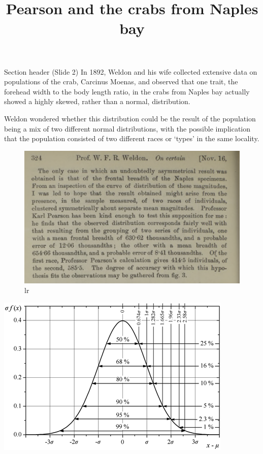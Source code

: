 \documentclass[
  ignorenonframetext,
]{beamer}
\title{Pearson and the crabs from Naples bay}
\author{}
\date{\vspace{-2.5em}}
\begin{document}
\frame{\titlepage}

\begin{frame}{Section header (Slide 2)}
\protect\hypertarget{section-header-slide-2}{}
In 1892, Weldon and his wife collected extensive data on populations of
the crab, Carcinus Moenas, and observed that one trait, the forehead
width to the body length ratio, in the crabs from Naples bay actually
showed a highly skewed, rather than a normal, distribution.

Weldon wondered whether this distribution could be the result of the
population being a mix of two different normal distributions, with the
possible implication that the population consisted of two different
races or `types' in the same locality.
\end{frame}

\begin{frame}{}
\protect\hypertarget{section}{}
\begin{figure}
\centering
\includegraphics{weldon_paper.png}
\caption{lr}
\end{figure}

\href{normal.png}{\includegraphics{normal.png}}
\end{frame}
\end{document}
